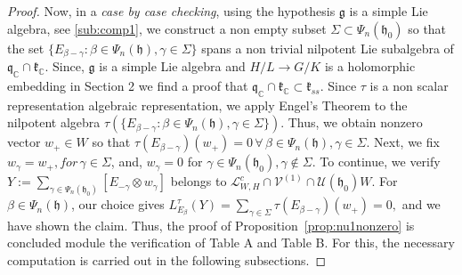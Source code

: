 \documentclass[12pt]{amsart}
\theoremstyle{definition}
\theoremstyle{remark}
\newcommand{\g}{\mathfrak{g}}
\newcommand{\h}{\mathfrak{h}}
\renewcommand{\k}{{\mathfrak k}}
\newcommand{\q}{\mathfrak q}
\newcommand{\C}{{\mathbb C}}
\numberwithin{equation}{section}
\begin{document}
\begin{proof}
Now, in a {\it case by case checking}, using the hypothesis $\g$ is a simple Lie algebra,  see \ref{sub:comp1}, we construct a non empty subset $\Sigma \subset \Psi_n(\h_0)$ so that the set $\{ E_{\beta -\gamma} : \beta \in \Psi_n(\h), \gamma \in \Sigma \}$ spans a non   trivial nilpotent Lie subalgebra of $\q_\C \cap \k_\C$. Since, $\g$ is a simple Lie algebra and $H/L \rightarrow G/K$ is a holomorphic embedding  in Section 2 we find a proof that $\q_\C \cap \k_\C \subset \k_{ss}$. Since $\tau $ is a non scalar representation   algebraic representation, we apply
Engel's Theorem to the nilpotent algebra $\tau(\{ E_{\beta -\gamma} : \beta \in \Psi_n(\h), \gamma \in \Sigma \})$. Thus, we obtain nonzero vector $w_+\in W $ so that $\tau(E_{\beta -\gamma})(w_+)=0 \, \forall \, \beta \in \Psi_n(\h), \gamma \in \Sigma $. Next, we fix $w_\gamma =w_+, for  \, \gamma \in \Sigma$, and, $w_\gamma =0 $ for $\gamma \in \Psi_n(\h_0), \gamma \notin \Sigma$. To continue, we verify $Y:=\sum_{\gamma \in \Psi_n(\h_0)} [E_{-\gamma} \otimes w_\gamma]$ belongs to $\mathcal L_{W,H}^c \cap \mathcal V^{(1)}\cap  \mathcal U(\h_0)W$. For $\beta \in \Psi_n(\h)$, our choice gives $L_{E_\beta}^\tau(Y)= \sum_{\gamma \in \Sigma} \tau( E_{\beta -\gamma})(w_+) =0, $ and we have shown the claim. Thus, the proof of Proposition~\ref{prop:nu1nonzero} is concluded module the verification of Table A and Table B. For this, the necessary computation   is carried out in the following subsections.  \end{proof}
\end{document}
